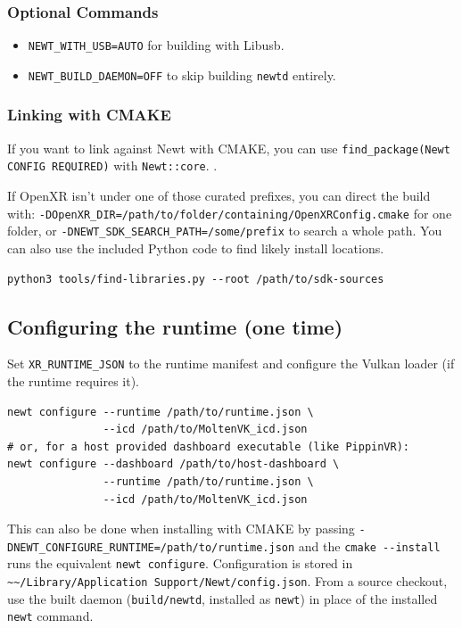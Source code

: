 \documentclass[11pt]{article}
\begin{document}
\subsubsection{Optional Commands}
\label{sec:orgee35afe}
\begin{itemize}
\item \texttt{NEWT\_WITH\_USB=AUTO} for building with Libusb.
\item \texttt{NEWT\_BUILD\_DAEMON=OFF} to skip building \texttt{newtd} entirely.
\end{itemize}
\subsubsection{Linking with CMAKE}
\label{sec:org0ce0959}
If you want to link against Newt with CMAKE, you can use  \texttt{find\_package(Newt CONFIG REQUIRED)} with \texttt{Newt::core}. .

If OpenXR isn't under one of those curated prefixes, you can direct the build with: \texttt{-DOpenXR\_DIR=/path/to/folder/containing/OpenXRConfig.cmake} for one folder, or \texttt{-DNEWT\_SDK\_SEARCH\_PATH=/some/prefix} to search a whole path. You can also use the included Python code to find likely install locations.
\begin{verbatim}
python3 tools/find-libraries.py --root /path/to/sdk-sources
\end{verbatim}
\subsection{Configuring the runtime (one time)}
\label{sec:org7f6f53b}
Set \texttt{XR\_RUNTIME\_JSON} to the runtime manifest and configure the Vulkan loader (if the runtime requires it).
\begin{verbatim}
newt configure --runtime /path/to/runtime.json \
               --icd /path/to/MoltenVK_icd.json
# or, for a host provided dashboard executable (like PippinVR):
newt configure --dashboard /path/to/host-dashboard \
               --runtime /path/to/runtime.json \
               --icd /path/to/MoltenVK_icd.json
\end{verbatim}
This can also be done when installing with CMAKE by passing  \texttt{-DNEWT\_CONFIGURE\_RUNTIME=/path/to/runtime.json} and the \texttt{cmake -{}-{}install} runs the equivalent \texttt{newt configure}.
Configuration is stored in \texttt{\textasciitilde{}\textasciitilde{}/Library/Application Support/Newt/config.json}. From a source checkout, use the built daemon (\texttt{build/newtd}, installed as \texttt{newt}) in place of the installed \texttt{newt} command.
\end{document}
